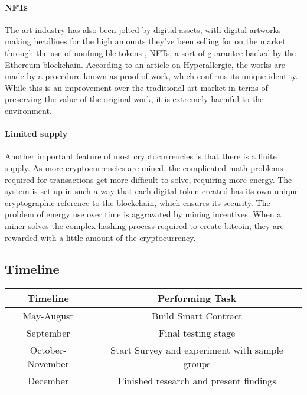 \documentclass[10pt,twocolumn]{article}
\begin{document}
\paragraph{NFTs}

The art industry has also been jolted by digital assets, with digital artworks making headlines for the high amounts they've been selling for on the market through the use of nonfungible tokens , NFTs, a sort of guarantee backed by the Ethereum blockchain. According to an article on Hyperallergic, the works are made by a procedure known as proof-of-work, which confirms its unique identity. While this is an improvement over the traditional art market in terms of preserving the value of the original work, it is extremely harmful to the environment.

\paragraph{Limited supply}

Another important feature of most cryptocurrencies is that there is a finite supply. As more cryptocurrencies are mined, the complicated math problems required for transactions get more difficult to solve, requiring more energy. The system is set up in such a way that each digital token created has its own unique cryptographic reference to the blockchain, which ensures its security. The problem of energy use over time is aggravated by mining incentives. When a miner solves the complex hashing process required to create bitcoin, they are rewarded with a little amount of the cryptocurrency.


\subsection{Timeline}

    \begin{tabular} { | c | c | }
    \hline
     Timeline & Performing Task \\
    \hline
    May-August & Build Smart Contract\\
    \hline
    September & Final testing stage\\
    \hline
    October-November & Start Survey and experiment with sample groups\\
    \hline
    December & Finished research and present findings\\
    \hline
    \end{tabular}
\end{document}
